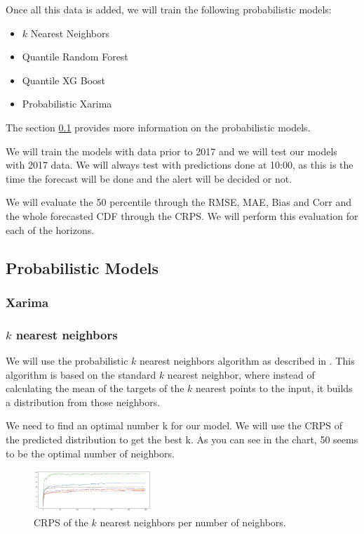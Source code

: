 \documentclass[a4paper,twocolumn,5p]{elsarticle}
\begin{document}
Once all this data is added, we will train the following probabilistic 
models:
\begin{itemize}
  \item $k$ Nearest Neighbors
  \item Quantile Random Forest
  \item Quantile XG Boost
  \item Probabilistic Xarima
\end{itemize} 
The section \ref{sec:models} provides more information on the probabilistic models.

We will train the models with data prior to 2017 and we will test our 
models with 2017 data. We will always test with 
predictions done at 10:00, as this is the time the 
forecast will be done and the alert will be decided 
or not.

We will evaluate the 50 percentile through the 
RMSE, MAE, Bias and Corr 
and the whole forecasted CDF through the CRPS. We will perform
this evaluation for each of the horizons.



\subsection{Probabilistic Models}
\label{sec:models}

\subsubsection{Xarima}

\subsubsection{$k$ nearest neighbors}

We will use the probabilistic $k$ nearest neighbors algorithm as described in  
\cite{quantileknnmangalova}. 
This algorithm is based on the standard $k$ nearest neighbor, where instead of calculating the mean of 
the targets of the
$k$ nearest points to the input, it builds a distribution 
from those neighbors.

We need to find an optimal number k for our model. We will use the CRPS of the predicted distribution
to get the best k. As you can see in the chart, 50 seems to be the optimal 
number of neighbors.

\begin{figure}
  \caption{CRPS of the $k$ nearest neighbors per number of neighbors.}
  \centering
  \includegraphics[width=0.4\textwidth]{kneighbor_crps}
\end{figure}
\end{document}
